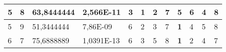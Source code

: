 \documentclass[conference]{IEEEtran}
\begin{document}
\begin{table*}[]
\begin{tabular}{|llll|llllllll|}
\multicolumn{1}{|l|}{5}                                                     & \multicolumn{1}{l|}{8}                                                        & \multicolumn{1}{l|}{63,8444444}                                                   & 2,566E-11                      & \multicolumn{1}{l|}{3}                                                  & \multicolumn{1}{l|}{\textbf{1}}                                         & \multicolumn{1}{l|}{2}                                                  & \multicolumn{1}{l|}{7}                                                  & \multicolumn{1}{l|}{5}                                                  & \multicolumn{1}{l|}{6}                                                  & \multicolumn{1}{l|}{4}                                                  & 8                          \\ \hline
\multicolumn{1}{|l|}{5}                                                     & \multicolumn{1}{l|}{9}                                                        & \multicolumn{1}{l|}{51,3444444}                                                   & 7,86E-09                       & \multicolumn{1}{l|}{6}                                                  & \multicolumn{1}{l|}{2}                                                  & \multicolumn{1}{l|}{3}                                                  & \multicolumn{1}{l|}{7}                                                  & \multicolumn{1}{l|}{\textbf{1}}                                         & \multicolumn{1}{l|}{4}                                                  & \multicolumn{1}{l|}{5}                                                  & 8                          \\ \hline
\multicolumn{1}{|l|}{6}                                                     & \multicolumn{1}{l|}{7}                                                        & \multicolumn{1}{l|}{75,6888889}                                                   & 1,0391E-13                     & \multicolumn{1}{l|}{6}                                                  & \multicolumn{1}{l|}{3}                                                  & \multicolumn{1}{l|}{5}                                                  & \multicolumn{1}{l|}{8}                                                  & \multicolumn{1}{l|}{\textbf{1}}                                         & \multicolumn{1}{l|}{2}                                                  & \multicolumn{1}{l|}{4}                                                  & 7                          \\ \hline

\end{tabular}
\end{table*}
\end{document}
